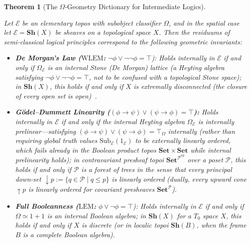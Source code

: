 \documentclass[10pt,twoside,openright]{book}
\theoremstyle{crmplain}
\newtheorem{theorem}{Theorem}[section]
\theoremstyle{crmdef}
\theoremstyle{crmremark}
\begin{document}
\begin{theorem}[The $\Omega$-Geometry Dictionary for Intermediate Logics]\label{thm:omega-dictionary}%
%

Let $\mathcal{E}$ be an elementary topos with subobject classifier $\Omega$, and in the spatial case let $\mathcal{E} = \mathbf{Sh}(X)$ be sheaves on a topological space $X$. Then the residuums of semi-classical logical principles correspond to the following geometric invariants:

\begin{itemize}[leftmargin=1.5em]

  \item \textbf{De Morgan's Law ($\mathrm{WLEM}$:} $\neg\phi \vee \neg\neg\phi = \top$): Holds internally in $\mathcal{E}$ if and only if $\Omega_{\mathcal{E}}$ is an internal Stone (De Morgan) lattice (a Heyting algebra satisfying $\neg\phi \vee \neg\neg\phi = \top$, not to be confused with a topological Stone space); in $\mathbf{Sh}(X)$, this holds if and only if $X$ is \emph{extremally disconnected} (the closure of every open set is open)~\cite{Johnstone82}.

  \item \textbf{G\"odel--Dummett Linearity ($(\phi \to \psi) \vee (\psi \to \phi) = \top$):} Holds internally in $\mathcal{E}$ if and only if the internal Heyting algebra $\Omega_{\mathcal{E}}$ is \emph{internally prelinear}---satisfying $(\phi \to \psi) \vee (\psi \to \phi) = \top_{\Omega}$ internally (rather than requiring global truth values $\mathrm{Sub}_{\mathcal{E}}(1_{\mathcal{E}})$ to be externally linearly ordered, which fails already in the Boolean product topos $\mathbf{Set} \times \mathbf{Set}$ while internal prelinearity holds); in contravariant presheaf topoi $\mathbf{Set}^{\mathcal{P}^{\mathrm{op}}}$ over a poset $\mathcal{P}$, this holds if and only if $\mathcal{P}$ is a \emph{forest of trees} in the sense that every principal down-set $\downarrow p := \{q \in \mathcal{P} \mid q \le p\}$ is linearly ordered (dually, every upward cone $\uparrow p$ is linearly ordered for covariant presheaves $\mathbf{Set}^{\mathcal{P}}$).

  \item \textbf{Full Booleanness ($\mathrm{LEM}$:} $\phi \vee \neg\phi = \top$): Holds internally in $\mathcal{E}$ if and only if $\Omega \simeq 1+1$ is an internal Boolean algebra; in $\mathbf{Sh}(X)$ for a $T_0$ space $X$, this holds if and only if $X$ is discrete (or in localic topoi $\mathbf{Sh}(B)$, when the frame $B$ is a complete Boolean algebra).

\end{itemize}

\end{theorem}
\end{document}
